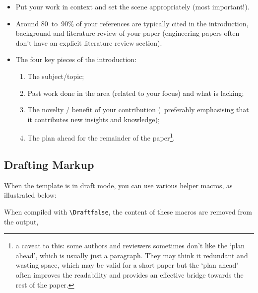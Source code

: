 \begin{itemize}
  \item Put your work in context and set the scene appropriately (most important!).

  \item Around 80~to~90\% of your references are typically cited in the introduction, background and literature review of your paper (engineering papers often don't have an explicit literature review section).

  \item The four key pieces of the introduction:
  \begin{enumerate}
    \item The subject/topic;
    \item Past work done in the area (related to your focus) and what is lacking;
    \item The novelty / benefit of your contribution (\ie~preferably emphasising that it contributes new insights and knowledge);
    \item The plan ahead for the remainder of the paper\footnote{a caveat to this: some authors and reviewers sometimes don't like the `plan ahead', which is usually just a paragraph.  They may think it redundant and wasting space, which may be valid for a short paper but the `plan ahead' often improves the readability and provides an effective bridge towards the rest of the paper.}.
  \end{enumerate}
\end{itemize}

\subsection{Drafting Markup}

When the template is in draft mode, you can use various helper macros, as illustrated below:

      When compiled with \verb|\Draftfalse|, the content of these macros are removed from the output, 





